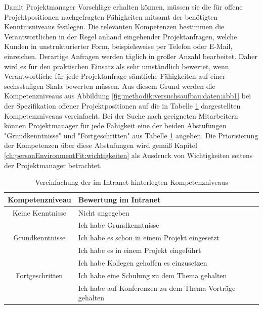 Damit Projektmanager Vorschläge erhalten können, müssen sie die für offene Projektpositionen nachgefragten Fähigkeiten mitsamt der benötigten Kenntnisniveaus festlegen. Die relevanten Kompetenzen bestimmen die Verantwortlichen in der Regel anhand eingehender Projektanfragen, welche Kunden in unstrukturierter Form, beispielsweise per Telefon oder E-Mail, einreichen. Derartige Anfragen werden täglich in großer Anzahl bearbeitet. Daher wird es für den praktischen Einsatz als sehr umständlich bewertet, wenn Verantwortliche für jede Projektanfrage sämtliche Fähigkeiten auf einer sechsstufigen Skala bewerten müssen. Aus diesem Grund werden die Kompetenzniveaus aus Abbildung \ref{fig:methodik:versuchsaufbau:daten:abb1} bei der Spezifikation offener Projektpositionen auf die in Tabelle \ref{tbl:methodik:versuchsaufbau:systemarchitektur:matrixservice:tbl1} dargestellten Kompetenzniveaus vereinfacht. Bei der Suche nach geeigneten Mitarbeitern können Projektmanager für jede Fähigkeit eine der beiden Abstufungen "Grundkenntnisse" und "Fortgeschritten" aus Tabelle \ref{tbl:methodik:versuchsaufbau:systemarchitektur:matrixservice:tbl1} angeben. Die Priorisierung der Kompetenzen über diese Abstufungen wird gemäß Kapitel \ref{ch:personEnvironmentFit:wichtigkeiten} als Ausdruck von Wichtigkeiten seitens der Projektmanager betrachtet.

\begin{table}[h]
	\centering
	\begin{tabularx}{\textwidth}{c|X}
		\textbf{Kompetenzniveau} & \textbf{Bewertung im Intranet}\\
		\hline
		Keine Kenntnisse & Nicht angegeben\\
		\hline
		& Ich habe Grundkenntnisse\\
		Grundkenntnisse & Ich habe es schon in einem Projekt eingesetzt\\
		& Ich habe es in einem Projekt eingeführt\\
		\hline
		& Ich habe Kollegen geholfen es einzusetzen\\
		Fortgeschritten & Ich habe eine Schulung zu dem Thema gehalten\\
		& Ich habe auf Konferenzen zu dem Thema Vorträge gehalten\\
		\hline
	\end{tabularx}
	\caption{Vereinfachung der im Intranet hinterlegten Kompetenzniveaus}
	\label{tbl:methodik:versuchsaufbau:systemarchitektur:matrixservice:tbl1}
\end{table}

